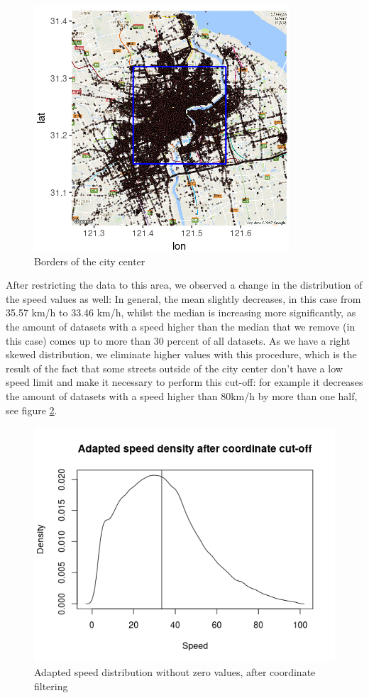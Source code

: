 \documentclass[11pt,conference,a4paper,twocolumns,romanappendices]{IEEEtran}
\begin{document}
\begin{figure}[h]
\centering
\includegraphics[scale=0.9]{borders.png}
\caption{\label{fig:borders}Borders of the city center}
\end{figure}

After restricting the data to this area, we observed a change in the distribution of the speed values as well: In general, the mean slightly decreases, in this case from 35.57 km/h to 33.46 km/h, whilst the median is increasing more significantly, as the amount of datasets with a speed higher than the median that we remove (in this case) comes up to more than 30 percent of all datasets. As we have a right skewed distribution, we eliminate higher values with this procedure, which is the result of the fact that some streets outside of the city center don't have a low speed limit and make it necessary to perform this cut-off: for example it decreases the amount of datasets with a speed higher than 80km/h by more than one half, see figure \ref{fig:speed_after}. \\

\begin{figure}[h]
\centering
\includegraphics[scale=0.6]{density_after.png}
\caption{\label{fig:speed_after}Adapted speed distribution without zero values, after coordinate filtering}
\end{figure}
\end{document}
